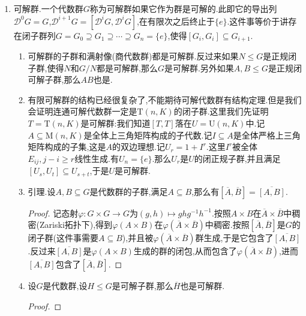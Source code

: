 \begin{enumerate}
\begin{proof}
    	(1):对任意$b\in B$,取态射$\varphi_b:A\to G$为$a\mapsto aba^{-1}b^{-1}$.按照$\varphi_b(e)=e$,以及$A$是连通的,就有$\{\varphi_b\mid b\in B\}$生成的闭子群是连通的,这个闭子群可以表示为$\varphi_{b_1}(A)^{e_1}\cdots\varphi_{b_n}(A)^{e_n}$,其中$e_i=\pm1$,进而它必然是$[A,B]$.
    	
    	\qquad
    	
    	(2):按照(1)已经有$[A^0,B]$和$[A,B^0]$都是闭连通正规子群(其中$A^0\le G$正规是因为$gA^0g^{-1}\subseteq A$也是包含幺元的连通子集,迫使$gA^0g^{-1}\subseteq A$).进而$C=[A^0,B][A,B^0]$也是闭正规子群(我们解释过如果$A,B$是两个闭子群,$A$包含在$B$的正规化子中,那么$AB$是闭子群).于是问题归结为一个群论问题:验证$[A,B]/C$是有限群.由于$A^0$在$G/C$中的像和$B$中的元可交换,$B^0$在$G/C$中的像和$A$中的元可交换.结合$A/A^0$和$B/B^0$都是有限的,说明任取$a\in A$和$b\in B$,就有$[a,b]$在$[A,B]/C$中的像是有限的.也即$[A/C,B/C]\subseteq G/C$是有限子群,进而上面引理说明$[A,B]$是有限群.
    \end{proof}
    \item 可解群.一个代数群$G$称为可解群如果它作为群是可解的.此即它的导出列$\mathscr{D}^0G=G$,$\mathscr{D}^{i+1}G=[\mathscr{D}^iG,\mathscr{D}^iG]$,在有限次之后终止于$\{e\}$.这件事等价于讲存在闭子群列$G=G_0\supseteq G_1\supseteq\cdots\supseteq G_n=\{e\}$,使得$[G_i,G_i]\subseteq G_{i+1}$.
    \begin{enumerate}[(1)]
    	\item 可解群的子群和满射像(商代数群)都是可解群.反过来如果$N\le G$是正规闭子群,使得$N$和$G/N$都是可解群,那么$G$是可解群.另外如果$A,B\le G$是正规闭可解子群,那么$AB$也是.
    	\item 有限可解群的结构已经很复杂了,不能期待可解代数群有结构定理.但是我们会证明连通可解代数群一定是$\mathrm{T}(n,K)$的闭子群.这里我们先证明$T=\mathrm{T}(n,K)$是可解群:我们知道$[T,T]$落在$U=\mathrm{U}(n,K)$中.记$A\subseteq\mathrm{M}(n,K)$是全体上三角矩阵构成的子代数.记$I\subseteq A$是全体严格上三角矩阵构成的子集,这是$A$的双边理想.记$U_r=1+I^r$.这里$I^r$被全体$E_{ij},j-i\ge r$线性生成.有$U_n=\{e\}$.那么$U_r$是$U$的闭正规子群,并且满足$[U_s,U_t]\subseteq U_{s+t}$,于是$U$是可解群.
    	\item 引理.设$A,B\subseteq G$是代数群的子群,满足$A\subseteq B$,那么有$[\overline{A},\overline{B}]=\overline{[A,B]}$.
    	\begin{proof}
    		
    		记态射$\varphi:G\times G\to G$为$(g,h)\mapsto ghg^{-1}h^{-1}$.按照$A\times B$在$\overline{A}\times\overline{B}$中稠密(Zariski拓扑下),得到$\varphi(A\times B)$在$\varphi(\overline{A}\times\overline{B})$中稠密.按照$[\overline{A},\overline{B}]$是$G$的闭子群(这件事需要$A\subseteq B$),并且被$\varphi(\overline{A}\times\overline{B})$群生成,于是它包含了$\overline{[A,B]}$.反过来$\overline{[A,B]}$是$\varphi(A\times B)$生成的群的闭包,从而包含了$\varphi(\overline{A}\times\overline{B})$,进而$\overline{[A,B]}$包含了$[\overline{A},\overline{B}]$.
    	\end{proof}
    	\item 设$G$是代数群,设$H\le G$是可解子群,那么$\overline{H}$也是可解群.
    	\begin{proof}
    		

\end{proof}
\end{enumerate}
\end{enumerate}
